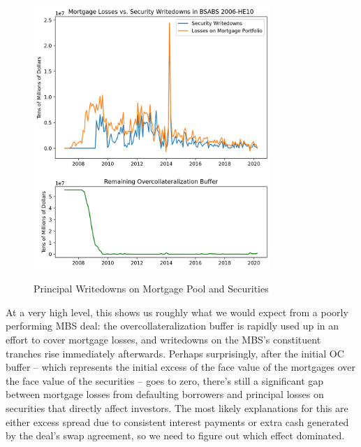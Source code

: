 \documentclass[12pt]{article}
\begin{document}
\begin{figure}[h]
	\centering
	\caption{Principal Writedowns on Mortgage Pool and Securities}
	\includegraphics[width=0.8\textwidth]{../figures/timeseries_losses_vs_writedowns}
	\label{fig:timeseries_losses_vs_writedowns}
\end{figure}

At a very high level, this shows us roughly what we would expect from a poorly performing MBS deal: the overcollateralization buffer is rapidly used up in an effort to cover mortgage losses, and writedowns on the MBS’s constituent tranches rise immediately afterwards. Perhaps surprisingly, after the initial OC buffer – which represents the initial excess of the face value of the mortgages over the face value of the securities – goes to zero, there’s still a significant gap between mortgage losses from defaulting borrowers and principal losses on securities that directly affect investors. The most likely explanations for this are either excess spread due to consistent interest payments or extra cash generated by the deal’s swap agreement, so we need to figure out which effect dominated.
\end{document}
